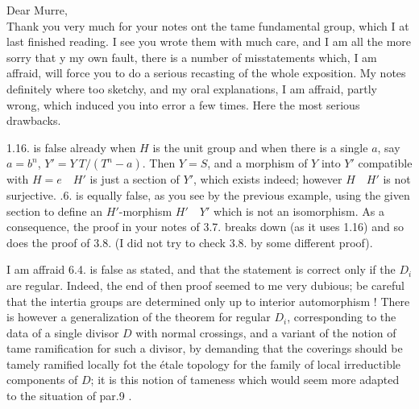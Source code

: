 Dear Murre,\\

Thank you very much for your notes ont the tame fundamental group, which I at last finished reading. I see you wrote them with much care, and I am all the more sorry that y my own fault, there is a number of misstatements which, I am affraid, will force you to do a serious recasting of the whole exposition. My notes definitely where too sketchy, and my oral explanations, I am affraid, partly wrong, which induced you into error a few times. Here the most serious drawbacks.

1.16. is false already when $H$ is the unit group and when there is a single $a$, say $a=b^n$, $Y'=Y\ T/(T^n-a)$. Then $Y=S$, and a morphism of $Y$ into $Y'$ compatible with $H=e\quad H'$ is just a section of $Y'$, which exists indeed; however $H\quad H'$ is not surjective. .6. is equally false, as you see by the previous example, using the given section to define an $H'$-morphism $H'\quad Y'$ which is not an isomorphism. As a consequence, the proof in your notes of 3.7. breaks down (as it uses 1.16) and so does the proof of 3.8. (I did not try to check 3.8. by some different proof).

I am affraid  6.4. is false as stated, and that the statement is correct only if the $D_i$ are regular. Indeed, the end of then  proof seemed to me very dubious; be careful that the intertia groups are determined only up to interior automorphism ! There is however a  generalization of the theorem for regular $D_i$, corresponding to the data of a single divisor $D$ with normal crossings, and a variant of the notion of tame ramification for such a divisor, by demanding that the coverings should be tamely ramified locally fot the étale topology for the family of local irreductible components of $D$; it is this notion of tameness which would seem more adapted to the situation of par.9 .
